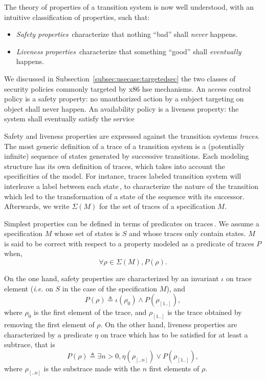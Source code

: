 The theory of properties of a transition system is now well understood, with an
intuitive classification of properties, such that:
%
\begin{itemize}
\item \emph{Safety properties}\,\cite{lamport1977proving,lamport1985logical}
  characterize that nothing ``bad'' shall \emph{never} happens.
\item \emph{Liveness properties}\,\cite{lamport1985logical,alpern1985liveness}
  characterize that something ``good'' shall \emph{eventually} happens.
\end{itemize}

We discussed in Subsection~\ref{subsec:usecase:targetedsec} the two classes of
security policies commonly targeted by x86 \ac{hse} mechanisms.
%
An access control policy is a safety property: no unauthorized action by a
subject targeting on object shall never happen.
%
An availability policy is a liveness property: the system shall eventually
satisfy the service

Safety and liveness properties are expressed against the transition systems
\emph{traces}.
%
The most generic definition of a trace of a transition system is a (potentially
infinite) sequence of states generated by successive transitions.
%
Each modeling structure has its own definition of traces, which takes into
account the specificities of the model.
%
For instance, traces labeled transition system will interleave a label between
each state\,\cite{vijayaraghavan2015modular}, to characterize the nature of the
transition which led to the transformation of a state of the sequence with its
successor.
%
Afterwards, we write \( \Sigma(M) \) for the set of traces of a specification
\( M \).

Simplest properties can be defined in terms of predicates on
traces\,\cite{alpern1987recognizing,schneider2000enforceable,basin2013enforceable}.
%
We assume a specification \( M \) whose set of states is \( S \) and whose
traces only contain states.
%
\( M \) is said to be correct with respect to a property modeled as a predicate
of traces \( P \) when,
%
\[
  \forall \rho \in \Sigma(M), P(\rho).
\]

On the one hand, safety properties are characterized by an invariant \( \iota \)
on trace element (\emph{i.e.} on \( S \) in the case of the specification
\( M \)), and
%
\[
  P(\rho) \triangleq \iota(\rho_0) \wedge P(\rho_{[1..]}),
\]
%
where \( \rho_0 \) is the first element of the trace, and \( \rho_{[1..]} \) is
the trace obtained by removing the first element of \( \rho \).
%
On the other hand, liveness properties are characterized by a predicate
\( \eta \) on trace which has to be satisfied for at least a subtrace, that is
%
\[
  P(\rho) \triangleq \exists n > 0, \eta(\rho_{[..n]}) \vee P(\rho_{[1..]}),
\]
%
where \( \rho_{[..n]} \) is the substrace made with the \( n \) first elements
of \( \rho \).


